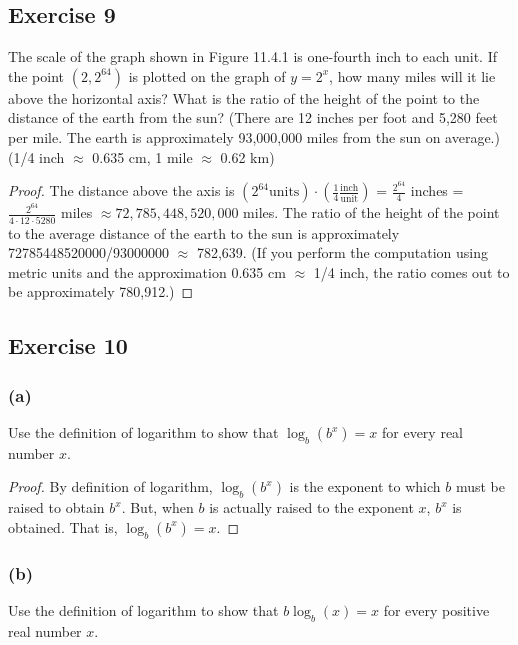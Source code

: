 \documentclass[14pt]{extarticle}
\newcommand{\dps}{\displaystyle}
\begin{document}
\subsection{Exercise 9}
The scale of the graph shown in Figure 11.4.1 is one-fourth inch to each unit. If the point \((2, 2^{64})\) is plotted on
the graph of \(y = 2^x\), how many miles will it lie above the horizontal axis? What is the ratio of the height of the point
to the distance of the earth from the sun? (There are 12 inches per foot and 5,280 feet per mile. The earth is
approximately 93,000,000 miles from the sun on average.) (1/4 inch \(\approx\) 0.635 cm, 1 mile \(\approx\) 0.62 km)

\begin{proof}
    The distance above the axis is \(\dps (2^{64} \text{units}) \cdot\left(\frac{1}{4}\frac{\text{inch}}{\text{unit}}\right)\)
    = \(\dps \frac{2^{64}}{4}\) inches = \(\dps \frac{2^{64}}{4 \cdot 12 \cdot 5280}\) miles \(\approx 72,785,448,520,000\)
    miles. The ratio of the height of the point to the average distance of the earth to the sun is approximately
    72785448520000/93000000 \(\approx\) 782,639. (If you perform the computation using metric units and the approximation 0.635
    cm \(\approx\) 1/4 inch, the ratio comes out to be approximately 780,912.)
\end{proof}

\subsection{Exercise 10}
\subsubsection{(a)}
Use the definition of logarithm to show that \(\log_b(b^x) = x\) for every real number \(x\).

\begin{proof}
    By definition of logarithm,  \(\log_b (b^x)\) is the exponent to which \(b\) must be raised to obtain \(b^x\). But, when
    \(b\) is actually raised to the exponent \(x\), \(b^x\) is obtained. That is, \(\log_b (b^x) = x\).
\end{proof}

\subsubsection{(b)}
Use the definition of logarithm to show that \(b\log_b(x) = x\) for every positive real number \(x\).
\end{document}
